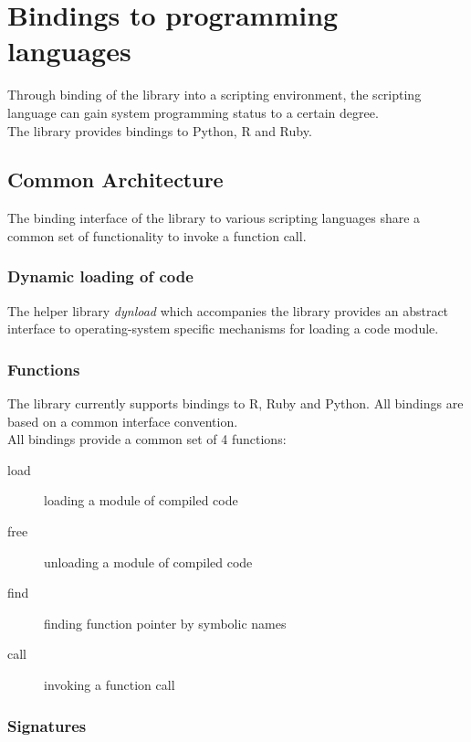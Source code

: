 \newpage
\section{Bindings to programming languages}

Through binding of the  library into a scripting environment,
the scripting language can gain system programming status to a certain degree.\\
The  library provides bindings to Python, R and Ruby.

\subsection{Common Architecture}

The binding interface of the  library to various scripting
languages share a common set of functionality to invoke a function call.

\subsubsection{Dynamic loading of code}

The helper library \emph{dynload} which accompanies the 
library provides an abstract interface to operating-system specific mechanisms
for loading a code module.

\subsubsection{Functions}

The  library currently supports bindings to R, Ruby and Python.
All bindings are based on a common interface convention.\\
All bindings provide a common set of 4 functions:
\begin{description}
\item [load] loading a module of compiled code
\item [free] unloading a module of compiled code
\item [find] finding function pointer by symbolic names
\item [call] invoking a function call
\end{description}

\pagebreak

\subsubsection{Signatures}

